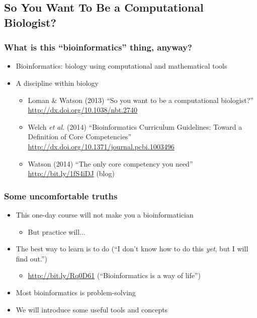 %

\subsection{So You Want To Be a Computational Biologist?}
\begin{frame}
  \frametitle{What is this ``bioinformatics'' thing, anyway?}
  \begin{itemize}
    \item Bioinformatics: biology using computational and mathematical tools
    \item A discipline within biology
    \begin{itemize}
      \item Loman \& Watson (2013) ``So you want to be a computational biologist?''
        \url{http://dx.doi.org/10.1038/nbt.2740}
      \item Welch \textit{et al.} (2014) ``Bioinformatics Curriculum Guidelines: Toward a Definition of Core Competencies''
      \url{http://dx.doi.org/10.1371/journal.pcbi.1003496}
      \item Watson (2014) ``The only core competency you need'' \url{http://bit.ly/1fS4iDJ} (blog)
    \end{itemize}
  \end{itemize}
\end{frame}

\begin{frame}
  \frametitle{Some uncomfortable truths}
  \begin{itemize}
    \item<1-> This one-day course will not make you a bioinformatician
    \begin{itemize}
      \item<2-> But practice will$\ldots$
    \end{itemize}
    \item<3-> The best way to learn is to do (``I don't know how to do this \emph{yet}, but I will find out.'')
    \begin{itemize}
      \item \url{http://bit.ly/Rq0D61} (``Bioinformatics is a way of life'')
    \end{itemize}
    \item<3-> Most bioinformatics is problem-solving
    \item<3-> We will introduce some useful tools and concepts
  \end{itemize}
\end{frame}

